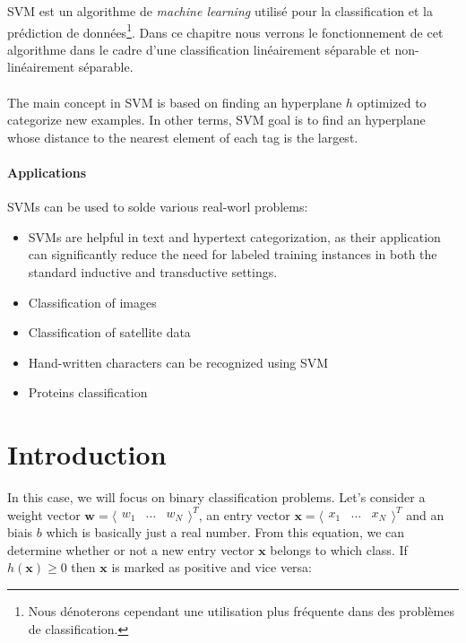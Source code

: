 \gls{SVM} est un algorithme de \textit{machine learning} utilisé pour la classification et la prédiction de données\footnote{Nous dénoterons cependant une utilisation plus fréquente dans des problèmes de classification.}. 
Dans ce chapitre nous verrons le fonctionnement de cet algorithme dans le cadre d'une classification linéairement séparable et non-linéairement séparable.

\paragraph{}
The main concept in \gls{SVM} is based on finding an hyperplane $h$ optimized to categorize new examples.
In other terms, \gls{SVM} goal is to find an hyperplane whose distance to the nearest element of each tag is the largest.

\paragraph{Applications}
\gls{SVM}s can be used to solde various real-worl problems:
\begin{itemize}
	\item \gls{SVM}s are helpful in text and hypertext categorization, as their application can significantly reduce the need for labeled training instances in both the standard inductive and transductive settings.
	\item Classification of images
	\item Classification of satellite data
	\item Hand-written characters can be recognized using SVM
	\item Proteins classification
\end{itemize}

\section{Introduction}

In this case, we will focus on binary classification problems.
Let's consider a weight vector $\mathbf w = \langle \begin{matrix} w_1 & \dots & w_N \end{matrix} \rangle^T$, an entry vector $\mathbf x = \langle \begin{matrix} x_1 & \dots & x_N \end{matrix} \rangle^T$ and an biais $b$ which is basically just a real number.
From this equation, we can determine whether or not a new entry vector $\mathbf x$ belongs to which class.
If $h(\mathbf x) \geq 0$ then $\mathbf x$ is marked as positive and vice versa:

